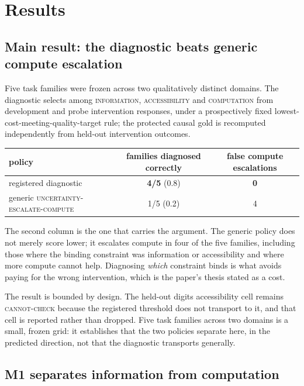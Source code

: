 \section{Results}



\subsection{Main result: the diagnostic beats generic compute escalation}

Five task families were frozen across two qualitatively distinct domains. The
diagnostic selects among \textsc{information}, \textsc{accessibility} and
\textsc{computation} from development and probe intervention responses, under a
prospectively fixed lowest-cost-meeting-quality-target rule; the protected causal
gold is recomputed independently from held-out intervention outcomes.

\begin{center}
\begin{tabular}{lcc}
\hline
policy & families diagnosed correctly & false compute escalations \\
\hline
registered diagnostic & \textbf{4/5} (0.8) & \textbf{0} \\
generic \textsc{uncertainty-escalate-compute} & 1/5 (0.2) & 4 \\
\hline
\end{tabular}
\end{center}

The second column is the one that carries the argument. The generic policy does
not merely score lower; it escalates compute in four of the five families,
including those where the binding constraint was information or accessibility and
where more compute cannot help. Diagnosing \emph{which} constraint binds is what
avoids paying for the wrong intervention, which is the paper's thesis stated as a
cost.

The result is bounded by design. The held-out digits accessibility cell remains
\textsc{cannot-check} because the registered threshold does not transport to it, and
that cell is reported rather than dropped. Five task families across two domains
is a small, frozen grid: it establishes that the two policies separate here, in
the predicted direction, not that the diagnostic transports generally.

\subsection{M1 separates information from computation}

